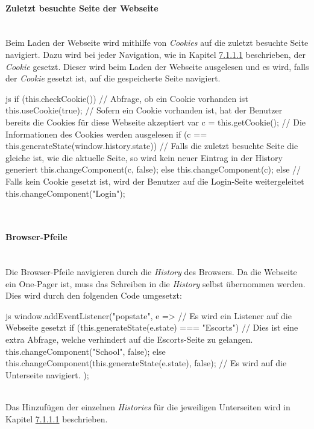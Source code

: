 \paragraph{Zuletzt besuchte Seite der Webseite}~\\
Beim Laden der Webseite wird mithilfe von \textit{Cookies} auf die zuletzt besuchte Seite navigiert. Dazu wird bei jeder Navigation, wie in Kapitel \hyperref[sec:navigation]{7.1.1.1} beschrieben, der \textit{Cookie} gesetzt. Dieser wird beim Laden der Webseite ausgelesen und es wird, falls der \textit{Cookie} gesetzt ist, auf die gespeicherte Seite navigiert.
\begin{code}{js}
	if (this.checkCookie()) {		// Abfrage, ob ein Cookie vorhanden ist
		this.useCookie(true);		// Sofern ein Cookie vorhanden ist, hat der Benutzer bereits die Cookies für diese Webseite akzeptiert
		var c = this.getCookie();	// Die Informationen des Cookies werden ausgelesen
		if (c == this.generateState(window.history.state)) {	// Falls die zuletzt besuchte Seite die gleiche ist, wie die aktuelle Seite, so wird kein neuer Eintrag in der History generiert
			this.changeComponent(c, false);
		} else {
			this.changeComponent(c);
		}
	} else {
		// Falls kein Cookie gesetzt ist, wird der Benutzer auf die Login-Seite weitergeleitet
		this.changeComponent("Login");
	}
\end{code}
~\\

\paragraph{Browser-Pfeile}~\\
Die Browser-Pfeile navigieren durch die \textit{History} des Browsers. Da die Webseite ein One-Pager ist, muss das Schreiben in die \textit{History} selbst übernommen werden. Dies wird durch den folgenden Code umgesetzt:
\begin{code}{js}
window.addEventListener("popstate", e => {			// Es wird ein Listener auf die Webseite gesetzt
	if (this.generateState(e.state) === "Escorts") {	// Dies ist eine extra Abfrage, welche verhindert auf die Escorts-Seite zu gelangen.
		this.changeComponent("School", false);
	} else {
		this.changeComponent(this.generateState(e.state), false);	// Es wird auf die Unterseite navigiert.
	}
});
\end{code}
~\\
Das Hinzufügen der einzelnen \textit{Histories} für die jeweiligen Unterseiten wird in Kapitel \hyperref[sec:navigation]{7.1.1.1} beschrieben.
\newpage
